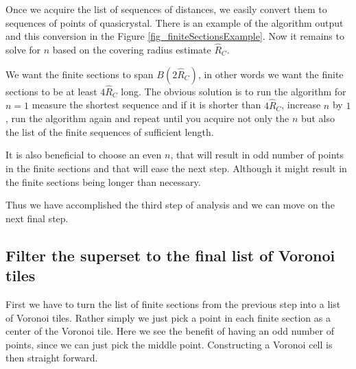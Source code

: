 \documentclass[text.tex]{subfiles}
\begin{document}
Once we acquire the list of sequences of distances, we easily convert them to sequences of points of quasicrystal. There is an example of the algorithm output and this conversion in the Figure \ref{fig_finiteSectionsExample}. Now it remains to solve for $n$ based on the covering radius estimate $\hat{R}_C$.

We want the finite sections to span $B(2\hat{R}_C)$, in other words we want the finite sections to be at least $4\hat{R}_C$ long. The obvious solution is to run the algorithm for $n=1$ measure the shortest sequence and if it is shorter than $4\hat{R}_C$, increase $n$ by $1$, run the algorithm again and repeat until you acquire not only the $n$ but also the list of the finite sequences of sufficient length. 

It is also beneficial to choose an even $n$, that will result in odd number of points in the finite sections and that will ease the next step. Although it might result in the finite sections being longer than necessary. 

Thus we have accomplished the third step of analysis and we can move on the next final step. 

\subsection{Filter the superset to the final list of Voronoi tiles}
First we have to turn the list of finite sections from the previous step into a list of Voronoi tiles. Rather simply we just pick a point in each finite section as a center of the Voronoi tile. Here we see the benefit of having an odd number of points, since we can just pick the middle point. Constructing a Voronoi cell is then straight forward. 
\end{document}
